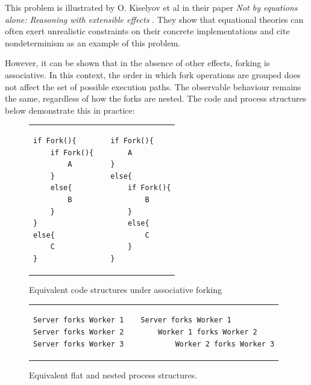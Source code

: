 \documentclass[logo,bsc,singlespacing,parskip]{infthesis}
\begin{document}
This problem is illustrated by  O. Kiselyov et al in their paper \textit{Not by equations alone: Reasoning with extensible effects} \cite{kiselyov2021not}. They show that equational theories can often exert unrealistic constraints on their concrete implementations and cite nondeterminism as an example of this problem.


However, it can be shown that in the absence of other effects, forking is associative. In this context, the order in which fork operations are grouped does not affect the set of possible execution paths. The observable behaviour remains the same, regardless of how the forks are nested. The code and process structures below demonstrate this in practice:

\vspace{-2em}
\begin{figure}[H]
    \centering


\begin{table}[H]
\centering
\begin{tabular}{p{} c p{}}
\begin{lstlisting}
if Fork(){
    if Fork(){
        A
    }
    else{
        B
    }
}
else{
    C
}
\end{lstlisting}
&
&
\begin{lstlisting}
if Fork(){
    A
} 
else{
    if Fork(){
        B
    }
    else{
        C
    }
}
\end{lstlisting}
\end{tabular}
\end{table}
\vspace{-2em}

    \caption{Equivalent code structures under associative forking}
    \label{fig:code-structures}
\end{figure}


\vspace{-1em} %
\begin{figure}[H]
    \centering
    \begin{tabular}{p{} c p{}}
        \begin{lstlisting}
Server forks Worker 1
Server forks Worker 2
Server forks Worker 3
        \end{lstlisting}
        &
        &
        \begin{lstlisting}
Server forks Worker 1
    Worker 1 forks Worker 2
        Worker 2 forks Worker 3
        \end{lstlisting}
    \end{tabular}
    \vspace{-1em} %

    \caption{Equivalent flat and nested process structures.}
    \label{fig:process-restructuring}
\end{figure}
\end{document}
